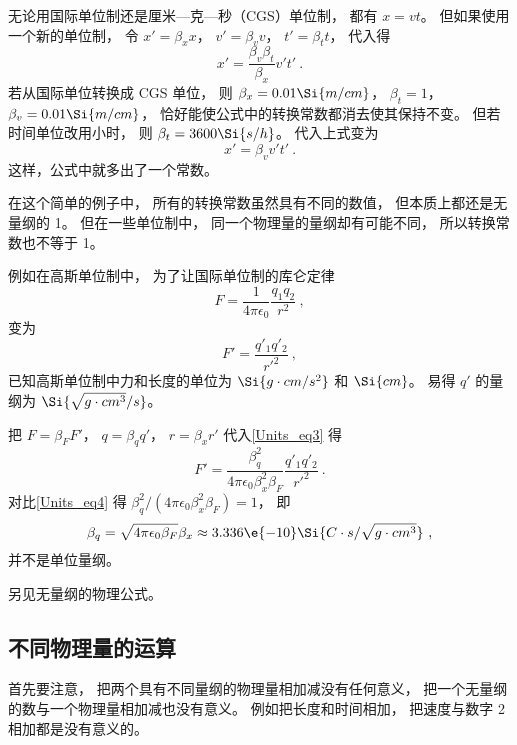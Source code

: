 \begin{example}{}
无论用国际单位制还是厘米—克—秒（CGS）单位制， 都有 $x = vt$。 但如果使用一个新的单位制， 令 $x' = \beta_x x$， $v' = \beta_v v$， $t' = \beta_t t$， 代入得
\begin{equation}
x' = \frac{\beta_v\beta_t}{\beta_x} v' t'~.
\end{equation}
若从国际单位转换成 CGS 单位， 则 $\beta_x = 0.01 \Si{m/cm}$， $\beta_t = 1$， $\beta_v = 0.01 \Si{m/cm}$， 恰好能使公式中的转换常数都消去使其保持不变。 但若时间单位改用小时， 则 $\beta_t = 3600 \Si{s/h}$。 代入上式变为
\begin{equation}
x' = \beta_v v' t'~.
\end{equation}
这样，公式中就多出了一个常数。
\end{example}
在这个简单的例子中， 所有的转换常数虽然具有不同的数值， 但本质上都还是无量纲的 1。 但在一些单位制中， 同一个物理量的量纲却有可能不同， 所以转换常数也不等于 1。
\begin{example}{}
例如在高斯单位制中， 为了让国际单位制的库仑定律
\begin{equation}\label{Units_eq3}
F = \frac{1}{4\pi\epsilon_0}\frac{q_1 q_2}{r^2}~,
\end{equation}
变为
\begin{equation}\label{Units_eq4}
F' = \frac{q'_1 q'_2}{r'^2}~,
\end{equation}
已知高斯单位制中力和长度的单位为 $\Si{g\cdot cm/s^2}$ 和 $\Si{cm}$。 易得 $q'$ 的量纲为 $\Si{\sqrt{g\cdot cm^3}/s}$。

把 $F = \beta_F F'$， $q = \beta_q q'$， $r = \beta_x r'$ 代入\autoref{Units_eq3} 得
\begin{equation}
F' =  \frac{\beta_q^2}{4\pi\epsilon_0\beta_x^2 \beta_F}\frac{q'_1 q'_2}{r'^2}~.
\end{equation}
对比\autoref{Units_eq4} 得 $\beta_q^2/(4\pi\epsilon_0\beta_x^2 \beta_F) = 1$， 即
\begin{equation}
\beta_q = \sqrt{4\pi\epsilon_0 \beta_F} \beta_x \approx 3.336\e{-10} \Si{C\cdot s/\sqrt{g\cdot cm^3}}~,
\end{equation}
并不是单位量纲。
\end{example}

另见无量纲的物理公式。

\subsection{不同物理量的运算}
首先要注意， 把两个具有不同量纲的物理量相加减没有任何意义， 把一个无量纲的数与一个物理量相加减也没有意义。 例如把长度和时间相加， 把速度与数字 2 相加都是没有意义的。


